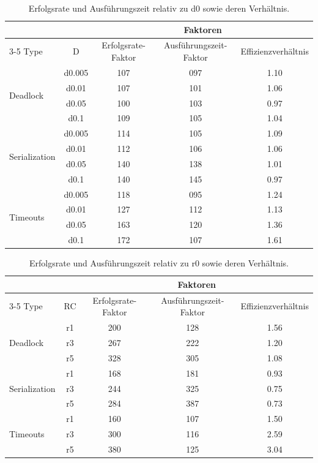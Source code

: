 
\begin{table}[htbp]
	\centering
	\footnotesize
	\begin{tabular}{l|c|ccc}
		\toprule
		& & \multicolumn{3}{c}{Faktoren} \\
		\cmidrule(lr){3-5}
		Type & D & Erfolgsrate-Faktor & Ausführungszeit-Faktor & Effizienzverhältnis \\
		\midrule
		\multirow{4}{*}{Deadlock}
		& d0.005 & 107 & 097 & 1.10 \\
		& d0.01  & 107 & 101 & 1.06 \\
		& d0.05  & 100 & 103 & 0.97 \\
		& d0.1   & 109 & 105 & 1.04 \\
		\midrule
		\multirow{4}{*}{Serialization}
		& d0.005 & 114 & 105 & 1.09 \\
		& d0.01  & 112 & 106 & 1.06 \\
		& d0.05  & 140 & 138 & 1.01 \\
		& d0.1   & 140 & 145 & 0.97 \\
		\midrule
		\multirow{4}{*}{Timeouts}
		& d0.005 & 118 & 095 & 1.24 \\
		& d0.01  & 127 & 112 & 1.13 \\
		& d0.05  & 163 & 120 & 1.36 \\
		& d0.1   & 172 & 107 & 1.61 \\
		\bottomrule
	\end{tabular}
	\caption{Erfolgsrate und Ausführungszeit relativ zu d0 sowie deren Verhältnis.}
	\label{tab:delay}
\end{table}

\begin{table}[htbp]
	\centering
	\footnotesize
	\begin{tabular}{l|c|ccc}
		\toprule
		& & \multicolumn{3}{c}{Faktoren} \\
		\cmidrule(lr){3-5}
		Type & RC & Erfolgsrate-Faktor & Ausführungszeit-Faktor & Effizienzverhältnis \\
		\midrule
		\multirow{3}{*}{Deadlock}
		& r1 & 200 & 128 & 1.56 \\
		& r3 & 267 & 222 & 1.20 \\
		& r5 & 328 & 305 & 1.08 \\
		\midrule
		\multirow{3}{*}{Serialization}
		& r1 & 168 & 181 & 0.93 \\
		& r3 & 244 & 325 & 0.75 \\
		& r5 & 284 & 387 & 0.73 \\
		\midrule
		\multirow{3}{*}{Timeouts}
		& r1 & 160 & 107 & 1.50 \\
		& r3 & 300 & 116 & 2.59 \\
		& r5 & 380 & 125 & 3.04 \\
		\bottomrule
	\end{tabular}
	\caption{Erfolgsrate und Ausführungszeit relativ zu r0 sowie deren Verhältnis.}
	\label{tab:retry_count}
\end{table}